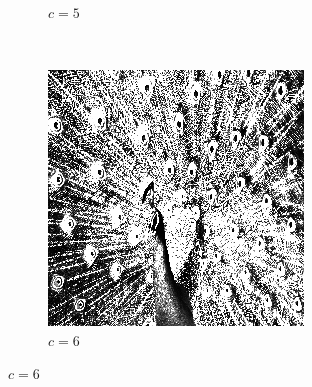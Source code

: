 \documentclass{article}
\begin{document}
\begin{enumerate}[label=(\alph*)]
\begin{figure}[!htb]
\begin{subfigure}[b]{0.3\textwidth}
            \caption{$c = 5$}
        \end{subfigure}
        ~
        \begin{subfigure}[b]{0.3\textwidth}
            \includegraphics[width=\textwidth]{img/ILT6.png}
            \caption{$c = 6$}
        \end{subfigure}
        
        

\end{figure}
\end{enumerate}
\end{document}

